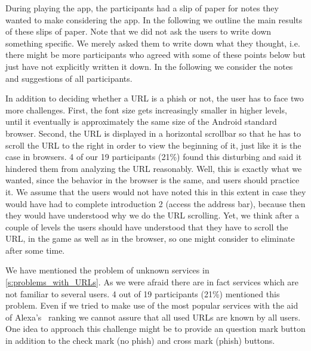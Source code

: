 


During playing the app, the participants had a slip of paper for notes they wanted to make considering the app.
In the following we outline the main results of these slips of paper.
Note that we did not ask the users to write down something specific. 
We merely asked them to write down what they thought, i.e. there might be more participants who agreed with some of these points below but just have not explicitly written it down.
In the following we consider the notes and suggestions of all participants. 

\begin{description}[leftmargin=0cm]	
	\item[Scrolling of URL] In addition to deciding whether a URL is a phish or not, the user has to face two more 	challenges. 
First, the font size gets increasingly smaller in higher levels, until it eventually is approximately the same size of the Android standard browser.
Second, the URL is displayed in a horizontal scrollbar so that he has to scroll the URL to the right in order to view the beginning of it, just like it is the case in browsers.
4 of our 19 participants (21\%) found this disturbing and said it hindered them from analyzing the URL reasonably. 
Well, this is exactly what we wanted, since the behavior in the browser is the same, and users should practice it.
We assume that the users would not have noted this in this extent in case they would have had to complete introduction 2 (access the address bar), because then they would have understood why we do the URL scrolling.
Yet, we think after a couple of levels the users should have understood that they have to scroll the URL, in the game as well as in the browser, so one might consider to eliminate after some time. 
	\item[Unknown Services] We have mentioned the problem of unknown services in \autoref{s:problems_with_URLs}.
As we were afraid there are in fact services which are not familiar to several users.
4 out of 19 participants (21\%) mentioned this problem.
Even if we tried to make use of the most popular services with the aid of Alexa's~\cite{alexa} ranking we cannot assure that all used URLs are known by all users.
One idea to approach this challenge might be to provide an question mark button in addition to the check mark (no phish) and cross mark (phish) buttons. 

\end{description}
